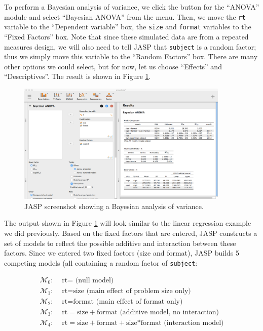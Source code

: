 \documentclass[english,,doc,floatsintext]{apa6}
\begin{document}
To perform a Bayesian analysis of variance, we click the button for the \enquote{ANOVA} module and select \enquote{Bayesian ANOVA} from the menu. Then, we move the \texttt{rt} variable to the \enquote{Dependent variable} box, the \texttt{size} and \texttt{format} variables to the \enquote{Fixed Factors} box. Note that since these simulated data are from a repeated measures design, we will also need to tell JASP that \texttt{subject} is a random factor; thus we simply move this variable to the \enquote{Random Factors} box. There are many other options we could select, but for now, let us choose \enquote{Effects} and \enquote{Descriptives}. The result is shown in Figure \ref{fig:anovaBayes}.

\begin{figure}
\centering
\includegraphics[width=0.9\textwidth,height=\textheight]{figures/anovaBayes.png}
\caption{\label{fig:anovaBayes}JASP screenshot showing a Bayesian analysis of variance.}
\end{figure}

The output shown in Figure \ref{fig:anovaBayes} will look similar to the linear regression example we did previously. Based on the fixed factors that are entered, JASP constructs a set of models to reflect the possible additive and interaction between these factors. Since we entered two fixed factors (size and format), JASP builds 5 competing models (all containing a random factor of \texttt{subject}:

\begin{align*}
  \mathcal{M}_{0}: & \text{ rt} = \text{ (null model)}\\
  \mathcal{M}_{1}: & \text{ rt} = \text{size} \text{ (main effect of problem size only)}\\
  \mathcal{M}_{2}: & \text{ rt} = \text{format} \text{ (main effect of format only)}\\
  \mathcal{M}_{3}: & \text{ rt} = \text{size}+\text{format} \text{ (additive model, no interaction)}\\
  \mathcal{M}_{4}: & \text{ rt} = \text{size}+\text{format}+\text{size*format} \text{ (interaction model)}\\
\end{align*}
\end{document}
